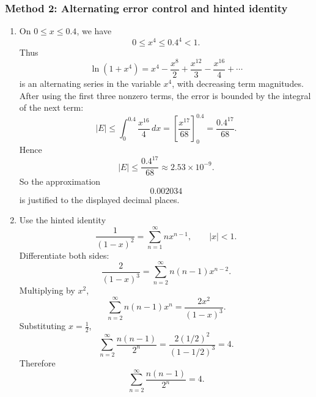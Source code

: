 \documentclass[12pt]{article}
\begin{document}
\subsubsection*{Method 2: Alternating error control and hinted identity}
\begin{enumerate}[label=(\alph*)]
\item On \(0\le x\le0.4\), we have
\[
0\le x^4\le0.4^4<1.
\]
Thus
\[
\ln(1+x^4)
=
x^4-\frac{x^8}{2}+\frac{x^{12}}3-\frac{x^{16}}4+\cdots
\]
is an alternating series in the variable \(x^4\), with decreasing term magnitudes. After using the first three nonzero terms, the error is bounded by the integral of the next term:
\[
|E|
\le
\int_0^{0.4}\frac{x^{16}}4\,dx
=
\left[\frac{x^{17}}{68}\right]_0^{0.4}
=
\frac{0.4^{17}}{68}.
\]
Hence
\[
|E|\le \frac{0.4^{17}}{68}\approx 2.53\times10^{-9}.
\]
So the approximation
\[
\boxed{0.002034}
\]
is justified to the displayed decimal places.

\newpage
\item Use the hinted identity
\[
\frac1{(1-x)^2}
=
\sum_{n=1}^{\infty}n x^{n-1},
\qquad |x|<1.
\]
Differentiate both sides:
\[
\frac2{(1-x)^3}
=
\sum_{n=2}^{\infty}n(n-1)x^{n-2}.
\]
Multiplying by \(x^2\),
\[
\sum_{n=2}^{\infty}n(n-1)x^n
=
\frac{2x^2}{(1-x)^3}.
\]
Substituting \(x=\frac12\),
\[
\sum_{n=2}^{\infty}\frac{n(n-1)}{2^n}
=
\frac{2(1/2)^2}{(1-1/2)^3}
=
4.
\]
Therefore
\[
\boxed{
\sum_{n=2}^{\infty}\frac{n(n-1)}{2^n}=4.
}
\]
\end{enumerate}
\end{document}
